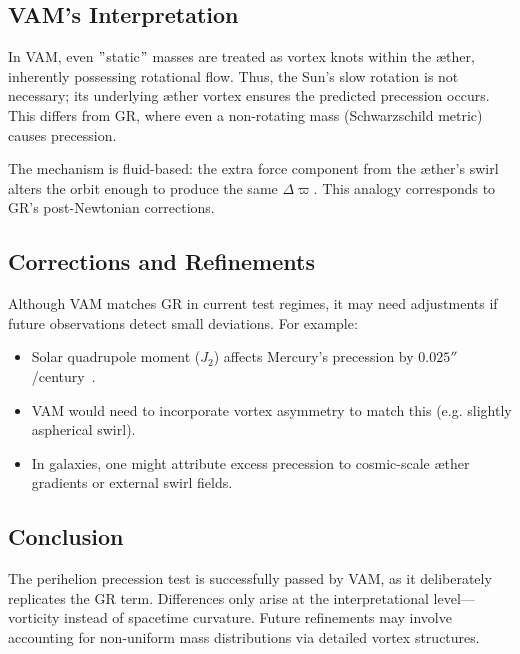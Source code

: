 \subsection*{VAM’s Interpretation}
In VAM, even \("\)static\("\) masses are treated as vortex knots within the æther, inherently possessing rotational flow. Thus, the Sun’s slow rotation is not necessary; its underlying æther vortex ensures the predicted precession occurs. This differs from GR, where even a non-rotating mass (Schwarzschild metric) causes precession.

The mechanism is fluid-based: the extra force component from the æther's swirl alters the orbit enough to produce the same $\Delta \varpi$. This analogy corresponds to GR’s post-Newtonian corrections.

\subsection*{Corrections and Refinements}
Although VAM matches GR in current test regimes, it may need adjustments if future observations detect small deviations. For example:
\begin{itemize}
    \item Solar quadrupole moment ($J_2$) affects Mercury’s precession by $0.025''$/century~\cite{sereno2006solar}.
    \item VAM would need to incorporate vortex asymmetry to match this (e.g. slightly aspherical swirl).
    \item In galaxies, one might attribute excess precession to cosmic-scale æther gradients or external swirl fields.
\end{itemize}

\subsection*{Conclusion}
The perihelion precession test is successfully passed by VAM, as it deliberately replicates the GR term. Differences only arise at the interpretational level—vorticity instead of spacetime curvature. Future refinements may involve accounting for non-uniform mass distributions via detailed vortex structures.